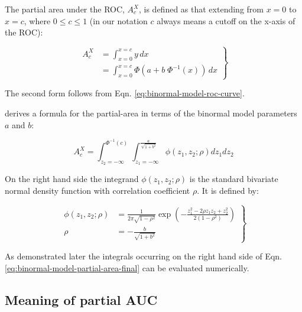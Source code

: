 \documentclass[
]{book}
\begin{document}
The partial area under the ROC, \(A_c^{X}\), is defined as that extending from \(x = 0\) to \(x = c\), where \(0 \le c \le 1\) (in our notation \(c\) always means a cutoff on the x-axis of the ROC):

\begin{equation} 
\left. 
\begin{aligned}
A_c^{X} &= \int_{x=0}^{x=c} y \, dx 
\\&=  \int_{x=0}^{x=c} \Phi\left ( a + b \; \Phi^{-1} \left ( x \right ) \right ) \, dx 
\end{aligned}
\right \}
\label{eq:binormal-model-partial-area-a1}
\end{equation}

The second form follows from Eqn. \eqref{eq:binormal-model-roc-curve}.

\citep{thompson1989statistical} derives a formula for the partial-area in terms of the binormal model parameters \(a\) and \(b\):

\begin{equation}
A_c^{X} = \int_{z_2=-\infty}^{\Phi^{-1}\left ( c \right )}   \int_{z_1=-\infty}^{\frac{a}{\sqrt{1+b^2}}} \phi\left ( z_1,z_2;\rho \right ) dz_1dz_2
\label{eq:binormal-model-partial-area-final}
\end{equation}

On the right hand side the integrand \(\phi\left ( z_1,z_2;\rho \right )\) is the standard bivariate normal density function with correlation coefficient \(\rho\). It is defined by:

\begin{equation}
\left. 
\begin{aligned}
\phi\left (z_1,z_2;\rho \right ) &= \frac{1}{2 \pi \sqrt{1-\rho^2}} \exp\left ( -\frac{z_1^2 -2\rho z_1 z_2 +z_2^2}{2\left ( 1-\rho^2 \right )} \right ) \\
\rho &= - \frac{b}{\sqrt{1+b^2}}
\end{aligned}
\right \}
\label{eq:binormal-model-bivariate-density}
\end{equation}

As demonstrated later the integrals occurring on the right hand side of Eqn. \eqref{eq:binormal-model-partial-area-final} can be evaluated numerically.

\hypertarget{binormal-model-meaning-partial-auc}{%
\subsection{Meaning of partial AUC}\label{binormal-model-meaning-partial-auc}}
\end{document}

